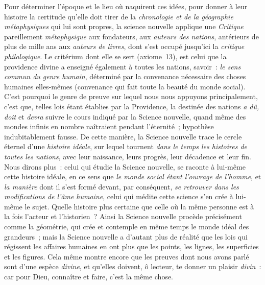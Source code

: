 \documentclass[french,twoside]{book} %
\begin{document}
Pour déterminer l’époque et le lieu où naquirent ces idées, pour donner à leur histoire la certitude qu’elle doit tirer de la {\itshape chronologie et de la géographie métaphysiques} qui lui sont propres, la science nouvelle applique une {\itshape Critique} pareillement {\itshape métaphysique} aux fondateurs, aux {\itshape auteurs des nations}, antérieurs de plus de mille ans aux {\itshape auteurs de livres}, dont s’est occupé jusqu’ici la {\itshape critique philologique}. Le critérium dont elle se sert (axiome 13), est celui que la providence divine a enseigné également à toutes les nations, savoir : {\itshape le sens commun du genre humain}, déterminé par la convenance nécessaire des choses humaines elles-mêmes (convenance qui fait toute la beauté du monde social). C’est pourquoi le genre de preuve sur lequel nous nous appuyons principalement, c’est que, telles lois étant établies par la Providence, la destinée des nations {\itshape a dû, doit} et {\itshape devra} suivre le cours indiqué par la Science nouvelle, quand même des mondes infinis en nombre naîtraient pendant l’éternité ; hypothèse indubitablement fausse. De cette manière, la Science nouvelle trace le cercle éternel d’une {\itshape histoire idéale}, sur lequel tournent {\itshape dans le temps les histoires de toutes les nations}, avec leur naissance, leurs progrès, leur  décadence et leur fin. Nous dirons plus : celui qui étudie la Science nouvelle, se raconte à lui-même cette histoire idéale, en ce sens que {\itshape le monde social étant l’ouvrage de l’homme}, et {\itshape la manière} dont il s’est formé devant, par conséquent, {\itshape se retrouver dans les modifications de l’âme humaine}, celui qui médite cette science s’en crée à lui-même le sujet. Quelle histoire plus certaine que celle où la même personne est à la fois l’acteur et l’historien ? Ainsi la Science nouvelle procède précisément comme la géométrie, qui crée et contemple en même temps le monde idéal des grandeurs ; mais la Science nouvelle a d’autant plus de réalité que les lois qui régissent les affaires humaines en ont plus que les points, les lignes, les superficies et les figures. Cela même montre encore que les preuves dont nous avons parlé sont d’une espèce {\itshape divine}, et qu’elles doivent, ô lecteur, te donner un plaisir {\itshape divin} : car pour Dieu, connaître et faire, c’est la même chose.\par
\end{document}
